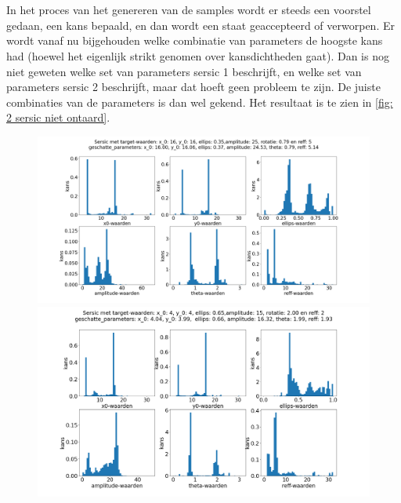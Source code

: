 \\ \\
In het proces van het genereren van de samples wordt er steeds een voorstel gedaan, een kans bepaald, en dan wordt een staat geaccepteerd of verworpen. Er wordt vanaf nu bijgehouden welke combinatie van parameters de hoogste kans had (hoewel het eigenlijk strikt genomen over kansdichtheden gaat). Dan is nog niet geweten welke set van parameters sersic 1 beschrijft, en welke set van parameters sersic 2 beschrijft, maar dat hoeft geen probleem te zijn. De juiste combinaties van de parameters is dan wel gekend. Het resultaat is te zien in \cref{fig: 2 sersic niet ontaard}.
\begin{figure}
    \begin{minipage}{0.98\linewidth}
        \includegraphics[width=0.95\linewidth]{Figures/1_emcee_hist_5000_750.png}   
        \label{fig:sersic 1}
        \includegraphics[width=0.95\linewidth]{Figures/2_emcee_hist_5000_750.png}
        \label{fig:sersic 2}

\end{minipage}
\end{figure}
